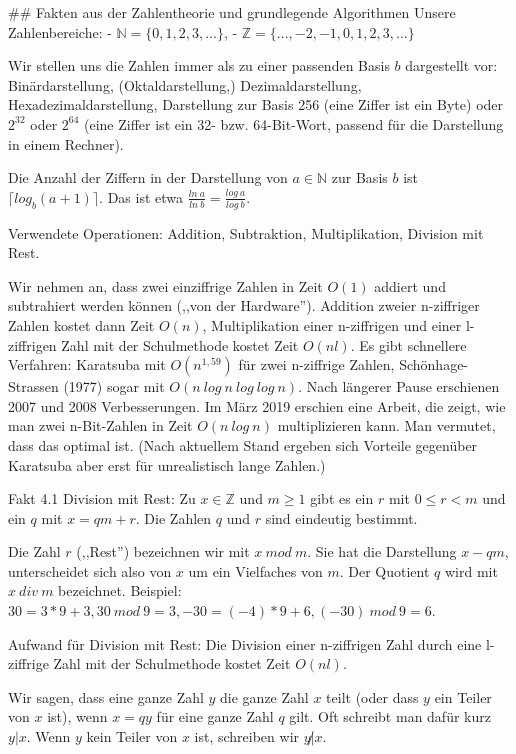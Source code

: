 \documentclass[a4paper]{article}
\begin{document}
\begin{multicols}{3}
## Fakten aus der Zahlentheorie und grundlegende Algorithmen
Unsere Zahlenbereiche:
- $\mathbb{N}=\{ 0 , 1 , 2 , 3 ,...\}$,
- $\mathbb{Z}=\{...,- 2 ,- 1 , 0 , 1 , 2 , 3 ,...\}$

Wir stellen uns die Zahlen immer als zu einer passenden Basis $b$ dargestellt vor: Binärdarstellung, (Oktaldarstellung,) Dezimaldarstellung, Hexadezimaldarstellung, Darstellung zur Basis 256 (eine Ziffer ist ein Byte) oder $2^{32}$ oder $2^{64}$ (eine Ziffer ist ein 32- bzw. 64-Bit-Wort, passend für die Darstellung in einem Rechner).

Die Anzahl der Ziffern in der Darstellung von $a\in\mathbb{N}$ zur Basis $b$ ist $\lceil  log_b(a+1)\rceil$. Das ist etwa $\frac{ln\ a}{ln\ b}=\frac{log\ a}{log\ b}$.

Verwendete Operationen: Addition, Subtraktion, Multiplikation, Division mit Rest.

Wir nehmen an, dass zwei einziffrige Zahlen in Zeit $O(1)$ addiert und subtrahiert werden können (,,von der Hardware''). Addition zweier n-ziffriger Zahlen kostet dann Zeit $O(n)$, Multiplikation einer n-ziffrigen und einer l-ziffrigen Zahl mit der Schulmethode kostet Zeit $O(nl)$. Es gibt schnellere Verfahren: Karatsuba mit $O(n^{1,59})$ für zwei n-ziffrige Zahlen, Schönhage-Strassen (1977) sogar mit $O(n\ log\ n\ log\ log\ n)$. Nach längerer Pause erschienen 2007 und 2008 Verbesserungen. Im März 2019 erschien eine Arbeit, die zeigt, wie man zwei n-Bit-Zahlen in Zeit $O(n\ log\ n)$ multiplizieren kann. Man vermutet, dass das optimal ist. (Nach aktuellem Stand ergeben sich Vorteile gegenüber Karatsuba aber erst für unrealistisch lange Zahlen.)

Fakt 4.1 Division mit Rest: Zu $x\in\mathbb{Z}$ und $m\geq 1$ gibt es ein $r$ mit $0\leq r < m$ und ein $q$ mit $x=qm+r$. Die Zahlen $q$ und $r$ sind eindeutig bestimmt.

Die Zahl $r$ (,,Rest'') bezeichnen wir mit $x\ mod\ m$. Sie hat die Darstellung $x-qm$, unterscheidet sich also von $x$ um ein Vielfaches von $m$. Der Quotient $q$ wird mit $x\ div\ m$ bezeichnet. 
Beispiel: $30 = 3*9 + 3, 30\ mod\ 9 = 3, -30 = (-4) *9 + 6, (-30)\ mod\ 9 = 6$.

Aufwand für Division mit Rest: Die Division einer n-ziffrigen Zahl durch eine l-ziffrige Zahl mit der Schulmethode kostet Zeit $O(nl)$.

Wir sagen, dass eine ganze Zahl $y$ die ganze Zahl $x$ teilt (oder dass $y$ ein Teiler von $x$ ist), wenn $x=qy$ für eine ganze Zahl $q$ gilt. Oft schreibt man dafür kurz $y|x$. Wenn $y$ kein Teiler von $x$ ist, schreiben wir $y\not|x$.


\end{multicols}
\end{document}

